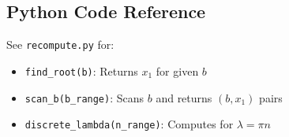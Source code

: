 \documentclass[11pt,a4paper]{article}
\theoremstyle{definition}
\theoremstyle{plain}
\theoremstyle{remark}
\begin{document}
\subsection{Python Code Reference}

See \texttt{recompute.py} for:
\begin{itemize}
\item \texttt{find\_root(b)}: Returns $x_1$ for given $b$
\item \texttt{scan\_b(b\_range)}: Scans $b$ and returns $(b, x_1)$ pairs
\item \texttt{discrete\_lambda(n\_range)}: Computes for $\lambda = \pi n$
\end{itemize}

\end{document}

